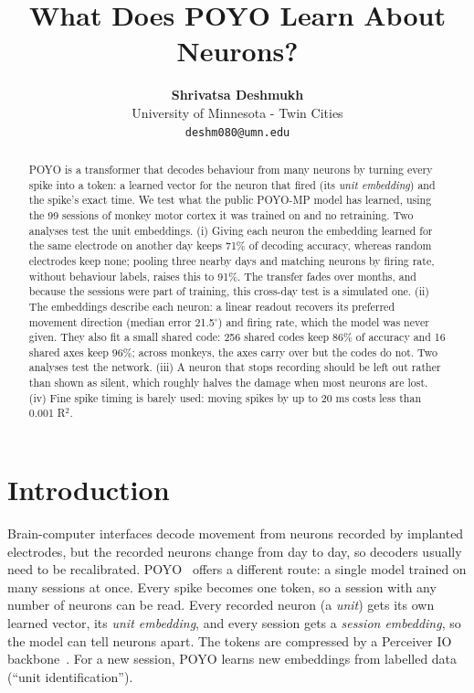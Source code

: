 \documentclass[11pt]{article}
\title{What Does POYO Learn About Neurons?}
\author{\textbf{Shrivatsa Deshmukh}\\
{\small University of Minnesota - Twin Cities}\\
{\small\texttt{deshm080@umn.edu}}}
\date{}
\begin{document}
\maketitle

\begin{abstract}
POYO is a transformer that decodes behaviour from many neurons by turning every spike into a token: a learned vector for the neuron that fired (its \emph{unit embedding}) and the spike's exact time. We test what the public POYO-MP model has learned, using the 99 sessions of monkey motor cortex it was trained on and no retraining. Two analyses test the unit embeddings. (i) Giving each neuron the embedding learned for the same electrode on another day keeps 71\% of decoding accuracy, whereas random electrodes keep none; pooling three nearby days and matching neurons by firing rate, without behaviour labels, raises this to 91\%. The transfer fades over months, and because the sessions were part of training, this cross-day test is a simulated one. (ii) The embeddings describe each neuron: a linear readout recovers its preferred movement direction (median error 21.5$^\circ$) and firing rate, which the model was never given. They also fit a small shared code: 256 shared codes keep 86\% of accuracy and 16 shared axes keep 96\%; across monkeys, the axes carry over but the codes do not. Two analyses test the network. (iii) A neuron that stops recording should be left out rather than shown as silent, which roughly halves the damage when most neurons are lost. (iv) Fine spike timing is barely used: moving spikes by up to 20 ms costs less than 0.001 R$^{2}$.
\end{abstract}

\section{Introduction}

Brain-computer interfaces decode movement from neurons recorded by implanted electrodes, but the recorded neurons change from day to day, so decoders usually need to be recalibrated. POYO~\cite{ref1} offers a different route: a single model trained on many sessions at once. Every spike becomes one token, so a session with any number of neurons can be read. Every recorded neuron (a \emph{unit}) gets its own learned vector, its \emph{unit embedding}, and every session gets a \emph{session embedding}, so the model can tell neurons apart. The tokens are compressed by a Perceiver IO backbone~\cite{ref2}. For a new session, POYO learns new embeddings from labelled data (``unit identification'').
\end{document}
